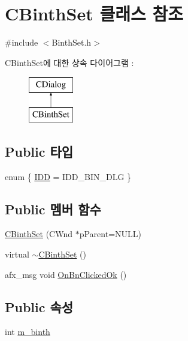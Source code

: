 \hypertarget{class_c_binth_set}{\section{C\-Binth\-Set 클래스 참조}
\label{class_c_binth_set}
}


{\ttfamily \#include $<$Binth\-Set.\-h$>$}

C\-Binth\-Set에 대한 상속 다이어그램 \-: \begin{figure}[H]
\begin{center}
\leavevmode
\includegraphics[height=2.000000cm]{class_c_binth_set}
\end{center}
\end{figure}
\subsection*{Public 타입}
\begin{DoxyCompactItemize}
\item 
enum \{ \hyperlink{class_c_binth_set_aca68a0fab0b7b10ebe4fd14a8a6c8c54a9d704acbd71024f8a51ae396d202392d}{I\-D\-D} = I\-D\-D\-\_\-\-B\-I\-N\-\_\-\-D\-L\-G
 \}
\end{DoxyCompactItemize}
\subsection*{Public 멤버 함수}
\begin{DoxyCompactItemize}
\item 
\hyperlink{class_c_binth_set_a3e8d4b627eea7c34e4779323dc6398fb}{C\-Binth\-Set} (C\-Wnd $\ast$p\-Parent=N\-U\-L\-L)
\item 
virtual \hyperlink{class_c_binth_set_aa9d7aa54a9308bc3a8c330f5289c4912}{$\sim$\-C\-Binth\-Set} ()
\item 
afx\-\_\-msg void \hyperlink{class_c_binth_set_a35f30f579e72fc9593335e620065aa15}{On\-Bn\-Clicked\-Ok} ()
\end{DoxyCompactItemize}
\subsection*{Public 속성}
\begin{DoxyCompactItemize}
\item 
int \hyperlink{class_c_binth_set_aa81e0016e3e463a022dbbaa6c7f85f2a}{m\-\_\-binth}
\end{DoxyCompactItemize}
